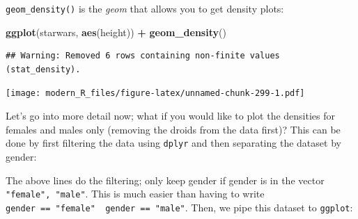\documentclass[]{gitbook}
\newenvironment{Shaded}{\begin{snugshade}}{\end{snugshade}}
\newcommand{\DataTypeTok}[1]{\textcolor[rgb]{0.13,0.29,0.53}{#1}}
\newcommand{\KeywordTok}[1]{\textcolor[rgb]{0.13,0.29,0.53}{\textbf{#1}}}
\newcommand{\NormalTok}[1]{#1}
\newcommand{\OperatorTok}[1]{\textcolor[rgb]{0.81,0.36,0.00}{\textbf{#1}}}
\newcommand{\StringTok}[1]{\textcolor[rgb]{0.31,0.60,0.02}{#1}}
\theoremstyle{definition}
\theoremstyle{definition}
\theoremstyle{definition}
\theoremstyle{remark}
\begin{document}
\texttt{geom\_density()} is the \emph{geom} that allows you to get
density plots:

\begin{Shaded}
\begin{Highlighting}[]
\KeywordTok{ggplot}\NormalTok{(starwars, }\KeywordTok{aes}\NormalTok{(height)) }\OperatorTok{+}
\StringTok{  }\KeywordTok{geom_density}\NormalTok{()}
\end{Highlighting}
\end{Shaded}

\begin{verbatim}
## Warning: Removed 6 rows containing non-finite values (stat_density).
\end{verbatim}

\texttt{[image: modern\_R\_files/figure-latex/unnamed-chunk-299-1.pdf]}

Let's go into more detail now; what if you would like to plot the
densities for females and males only (removing the droids from the data
first)? This can be done by first filtering the data using
\texttt{dplyr} and then separating the dataset by gender:

\begin{Shaded}
\end{Shaded}

The above lines do the filtering; only keep gender if gender is in the
vector \texttt{"female",\ "male"}. This is much easier than having to
write \texttt{gender\ ==\ "female"\ \textbar{}\ gender\ ==\ "male"}.
Then, we pipe this dataset to \texttt{ggplot}:

\begin{Shaded}
\end{Shaded}
\end{document}

